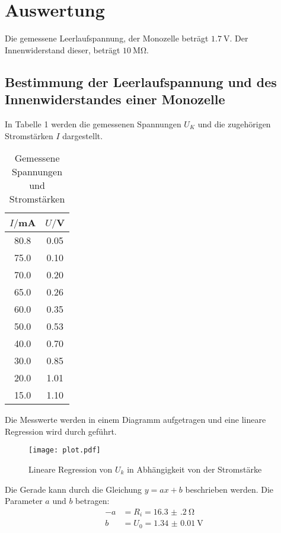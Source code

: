 \section{Auswertung}
\label{sec:Auswertung}

Die gemessene Leerlaufspannung, der Monozelle beträgt $\SI{1.7}{\volt}$. Der Innenwiderstand dieser, beträgt $\SI{10}{\mega\ohm}$.

\subsection{Bestimmung der Leerlaufspannung und des Innenwiderstandes einer Monozelle}

In Tabelle 1 werden die gemessenen Spannungen $U_K$ und die zugehörigen Stromstärken $I$ dargestellt.

\begin{table}[H]
  \centering
  \caption{Gemessene Spannungen und Stromstärken}
  \label{tab:spannung1}
  \begin{tabular}{c c}
    \toprule
    $I/$mA & $U/$V \\
    \midrule
    80.8  &  0.05 \\
    75.0  &  0.10 \\
    70.0  &  0.20 \\
    65.0  &  0.26 \\
    60.0  &  0.35 \\
    50.0  &  0.53 \\
    40.0  &  0.70 \\
    30.0  &  0.85 \\
    20.0  &  1.01 \\
    15.0  &  1.10 \\
    \bottomrule
  \end{tabular}
\end{table}

Die Messwerte werden in einem Diagramm aufgetragen und eine lineare Regression wird durch geführt.


\begin{figure}[H]
  \centering
  \texttt{[image: plot.pdf]}
  \caption{Lineare Regression von $U_k$ in Abhängigkeit von der Stromstärke}
  \label{fig:plot}
\end{figure}

Die Gerade kann durch die Gleichung $y = ax + b$ beschrieben werden. Die Parameter $a$ und $b$ betragen:
\begin{align*}
  -a &= R_i = \SI{16.3(2)}{\ohm} \\
  b &= U_0 = \SI{1.34(1)}{\volt}
\end{align*}

